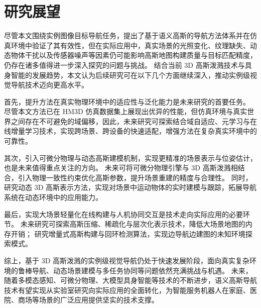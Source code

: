 \section {研究展望}

尽管本文围绕实例图像目标导航任务，提出了基于语义高斯的导航方法体系并在仿真环境中验证了其有效性，但在实际应用中，真实场景的光照变化、纹理缺失、动态物体干扰以及传感器噪声等因素仍可能影响高斯地图构建质量与目标匹配精度，仍存在诸多值得进一步深入探究的问题与挑战。
结合当前 3D 高斯泼溅技术与具身智能的发展趋势，本文认为后续研究可在以下几个方面继续深入，推动实例级视觉导航技术迈向更高水平。

首先，提升方法在真实物理环境中的适应性与泛化能力是未来研究的首要任务。
尽管本文方法已在 HM3D 仿真数据集上展现出优异的性能，但仿真环境与真实世界之间存在不可避免的域偏移，因此，未来研究可探索结合域自适应、元学习与在线增量学习技术，实现跨场景、跨设备的快速适配，增强方法在复杂真实环境中的可靠性。

其次，引入可微分物理与动态高斯建模机制，实现更精准的场景表示与位姿估计，也是未来值得重点关注的方向。
未来可将可微分物理引擎与 3D 高斯泼溅相结合，引入物理一致性约束优化高斯参数，提升场景重建的精度与合理性。
同时，研究动态 3D 高斯表示方法，实现对场景中运动物体的实时建模与跟踪，拓展导航系统在动态环境中的应用能力。

最后，实现大场景轻量化在线构建与人机协同交互是技术走向实际应用的必要环节。
未来研究可探索高斯压缩、稀疏化与层次化表示技术，降低大场景地图的内存开销；
研究增量式高斯构建与回环检测算法，实现边导航边建图的未知环境探索模式。

综上，基于 3D 高斯泼溅的实例级视觉导航仍处于快速发展阶段，面向真实复杂环境的鲁棒导航、动态场景建模与多任务协同等问题依然充满挑战与机遇。
未来，随着多模态感知、可微分物理、大模型具身智能等技术的不断进步，语义高斯导航技术有望实现从实验室研究向实际应用的全面转化，为智能服务机器人在家庭、医院、商场等场景的广泛应用提供坚实的技术支撑。
